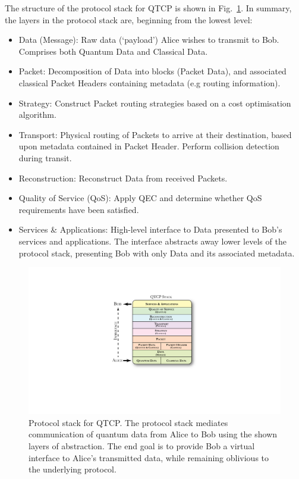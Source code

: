\documentclass[aps,rmp,twocolumn,amsmath,amssymb,nofootinbib,superscriptaddress,longbibliography,floatfix]{revtex4-1}
\begin{document}
The structure of the protocol stack for QTCP is shown in Fig.~\ref{fig:stack}. In summary, the layers in the protocol stack are, beginning from the lowest level:
\begin{itemize}
\item {\sc Data (Message)}: Raw data (`payload') Alice wishes to transmit to Bob. Comprises both {\sc Quantum Data} and {\sc Classical Data}.
\item {\sc Packet}: Decomposition of {\sc Data} into blocks ({\sc Packet Data}), and associated classical {\sc Packet Headers} containing metadata (e.g routing information).
\item {\sc Strategy}: Construct {\sc Packet} routing strategies based on a cost optimisation algorithm.
\item {\sc Transport}: Physical routing of {\sc Packets} to arrive at their destination, based upon metadata contained in {\sc Packet Header}. Perform collision detection during transit.
\item {\sc Reconstruction}: Reconstruct {\sc Data} from received {\sc Packets}.
\item {\sc Quality of Service (QoS)}: Apply QEC and determine whether {\sc QoS} requirements have been satisfied.
\item {\sc Services \& Applications}: High-level interface to {\sc Data} presented to Bob's services and applications. The interface abstracts away lower levels of the protocol stack, presenting Bob with only {\sc Data} and its associated metadata.
\end{itemize}

\begin{figure}[!htb]
\includegraphics[width=\columnwidth]{stack}
\caption{Protocol stack for QTCP. The protocol stack mediates communication of quantum data from Alice to Bob using the shown layers of abstraction. The end goal is to provide Bob a virtual interface to Alice's transmitted data, while remaining oblivious to the underlying protocol.} \label{fig:stack}
\end{figure}
\end{document}
